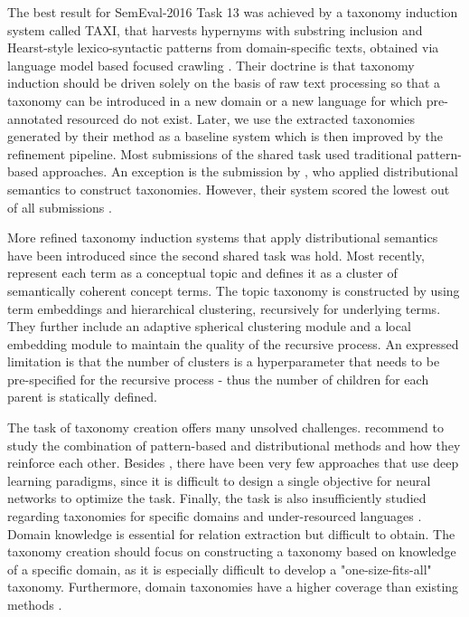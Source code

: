 \documentclass[12pt, headsepline, a4paper]{scrartcl}
\begin{document}
The best result for SemEval-2016 Task 13 was achieved by a taxonomy induction system called TAXI, that harvests hypernyms with substring inclusion and Hearst-style lexico-syntactic patterns from domain-specific texts, obtained via language model based focused crawling \citep{panchenko2016taxi}. Their doctrine is that taxonomy induction should be driven solely on the basis of raw text processing so that a taxonomy can be introduced in a new domain or a new language for which pre-annotated resourced do not exist. Later, we use the extracted taxonomies generated by their method as a baseline system which is then improved by the refinement pipeline.
Most submissions of the shared task used traditional pattern-based approaches. An exception is the submission by \cite{pocostales2016nuig}, who applied distributional semantics to construct taxonomies. However, their system scored the lowest out of all submissions \citep{bordea2016semeval}.


More refined taxonomy induction systems that apply distributional semantics have been introduced since the second shared task was hold. Most recently, \cite{Zhang:2018:TUT:3219819.3220064} represent each term as a conceptual topic and defines it as a cluster of semantically coherent concept terms. The topic taxonomy is constructed by using term embeddings and hierarchical clustering, recursively for underlying terms. They further include an adaptive spherical clustering module and a local embedding module to maintain the quality of the recursive process. An expressed limitation is that the number of clusters is a hyperparameter that needs to be pre-specified for the recursive process - thus the number of children for each parent is statically defined.

The task of taxonomy creation offers many unsolved challenges. \cite{wang2017short} recommend to study the combination of pattern-based and distributional methods and how they reinforce each other. Besides \cite{shwartz2016improving}, there have been very few approaches that use deep learning paradigms, since it is difficult to design a single objective for neural networks to optimize the task. Finally, the task is also insufficiently studied regarding taxonomies for specific domains and under-resourced languages \citep{wang2017short}. Domain knowledge is essential for relation extraction but difficult to obtain. The taxonomy creation should focus on constructing a taxonomy based on knowledge of a specific domain, as it is especially difficult to develop a "one-size-fits-all" taxonomy. Furthermore, domain taxonomies have a higher coverage than existing methods \citep{alfarone2015unsupervised}.
\end{document}
